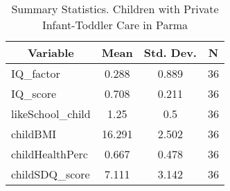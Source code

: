 
\begin{table}[htbp]\centering \caption{Summary Statistics. Children with Private Infant-Toddler Care in Parma \label{bothChildasiloPrivParma}}
\begin{tabular}{l c c  c}\hline\hline
\multicolumn{1}{c}{\textbf{Variable}} & \textbf{Mean}
 & \textbf{Std. Dev.} & \textbf{N}\\ \hline
IQ\_factor & 0.288 & 0.889  & 36\\
IQ\_score & 0.708 & 0.211  & 36\\
likeSchool\_child & 1.25 & 0.5  & 36\\
childBMI & 16.291 & 2.502  & 36\\
childHealthPerc & 0.667 & 0.478  & 36\\
childSDQ\_score & 7.111 & 3.142  & 36\\
\hline\end{tabular}
\end{table}

